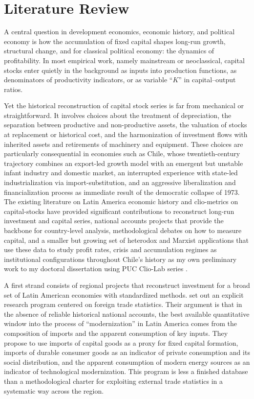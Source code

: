 \documentclass[11pt,a4paper]{article}
\begin{document}
\section{Literature Review}


A central question in development economics, economic history, and political economy is how the accumulation of fixed capital shapes long-run growth, structural change, and for classical political economy: the dynamics of profitability. In most empirical work, namely mainstream or neoclassical, capital stocks enter quietly in the background as inputs into production functions, as denominators of productivity indicators, or as variable ``$K$'' in capital--output ratios. 

Yet the historical reconstruction of capital stock series is far from mechanical or straightforward. It involves choices about the treatment of depreciation, the separation between productive and non-productive assets, the valuation of stocks at replacement or historical cost, and the harmonization of investment flows with inherited assets and retirements of machinery and equipment. These choices are particularly consequential in economies such as Chile, whose twentieth-century trajectory combines an export-led growth model with an emergent but unstable infant industry and domestic market, an interrupted experience with state-led industrialization via import-substitution, and an aggressive liberalization and financialization process as immediate result of the democratic collapse of 1973. The existing literature on Latin America economic history and clio-metrics on capital-stocks have provided significant contributions to reconstruct long-run investment and capital series, national accounts projects that provide the backbone for country-level analysis, methodological debates on how to measure capital, and a smaller but growing set of heterodox and Marxist applications that use these data to study profit rates, crisis and accumulation regimes as institutional configurations throughout Chile's history as my own preliminary work to my doctoral dissertation using PUC Clio-Lab series \citep{Polanco2019}.  


A first strand consists of regional projects that reconstruct investment for a broad set of Latin American economies with standardized methods. \citet{Carreras2006} set out an explicit research program centered on foreign trade statistics. Their argument is that in the absence of reliable historical national accounts, the best available quantitative window into the process of ``modernization'' in Latin America comes from the composition of imports and the apparent consumption of key inputs. They propose to use imports of capital goods as a proxy for fixed capital formation, imports of durable consumer goods as an indicator of private consumption and its social distribution, and the apparent consumption of modern energy sources as an indicator of technological modernization. This program is less a finished database than a methodological charter for exploiting external trade statistics in a systematic way across the region.
\end{document}
